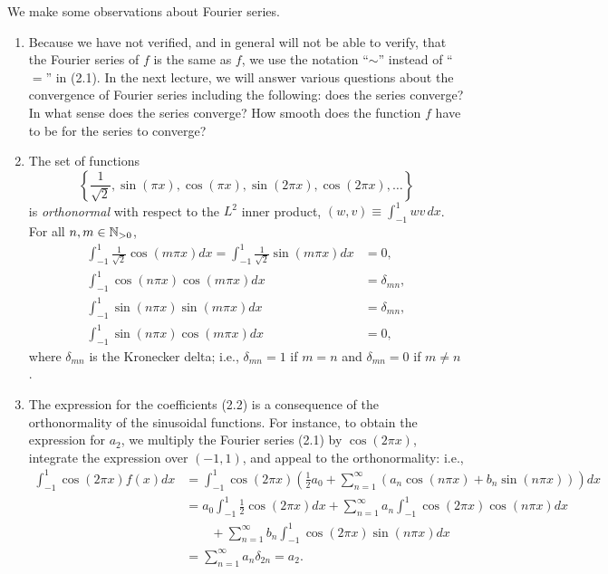 We make some observations about Fourier series.
\begin{enumerate}
    \item Because we have not verified, and in general will not be able to verify, that the Fourier series of $f$ is the same as $f$, we use the notation ``$\sim$'' instead of ``$=$'' in (2.1). In the next lecture, we will answer various questions about the convergence of Fourier series including the following: does the series converge? In what sense does the series converge? How smooth does the function $f$ have to be for the series to converge?
    \item The set of functions
    \[\left\{\frac{1}{\sqrt{2}}, \sin(\pi x), \cos(\pi x), \sin(2\pi x), \cos(2\pi x), \dots\right\}\]
    is \textit{orthonormal} with respect to the $L^2$ inner product, $(w, v) \equiv \int_{-1}^{1} wv\,dx$. For all $n, m \in \mathbb{N}_{>0}$,
    \begin{align*}
        \int_{-1}^{1} \frac{1}{\sqrt{2}} \cos(m\pi x) dx = \int_{-1}^{1} \frac{1}{\sqrt{2}} \sin(m\pi x) dx &= 0, \\
        \int_{-1}^{1} \cos(n\pi x) \cos(m\pi x) dx &= \delta_{mn}, \\
        \int_{-1}^{1} \sin(n\pi x) \sin(m\pi x) dx &= \delta_{mn}, \\
        \int_{-1}^{1} \sin(n\pi x) \cos(m\pi x) dx &= 0,
    \end{align*}
    where $\delta_{mn}$ is the Kronecker delta; i.e., $\delta_{mn} = 1$ if $m = n$ and $\delta_{mn} = 0$ if $m \neq n$.
    \item The expression for the coefficients (2.2) is a consequence of the orthonormality of the sinusoidal functions. For instance, to obtain the expression for $a_2$, we multiply the Fourier series (2.1) by $\cos(2\pi x)$, integrate the expression over $(-1, 1)$, and appeal to the orthonormality: i.e.,
    \begin{align*}
        \int_{-1}^{1} \cos(2\pi x) f(x) dx &= \int_{-1}^{1} \cos(2\pi x) \left(\frac{1}{2} a_0 + \sum_{n=1}^{\infty} \left(a_n \cos(n\pi x) + b_n \sin(n\pi x)\right)\right) dx \\
        &= a_0 \int_{-1}^{1} \frac{1}{2} \cos(2\pi x) dx + \sum_{n=1}^{\infty} a_n \int_{-1}^{1} \cos(2\pi x) \cos(n\pi x) dx \\
        &\qquad + \sum_{n=1}^{\infty} b_n \int_{-1}^{1} \cos(2\pi x) \sin(n\pi x) dx \\
        &= \sum_{n=1}^{\infty} a_n \delta_{2n} = a_2.
    \end{align*}

\end{enumerate}
